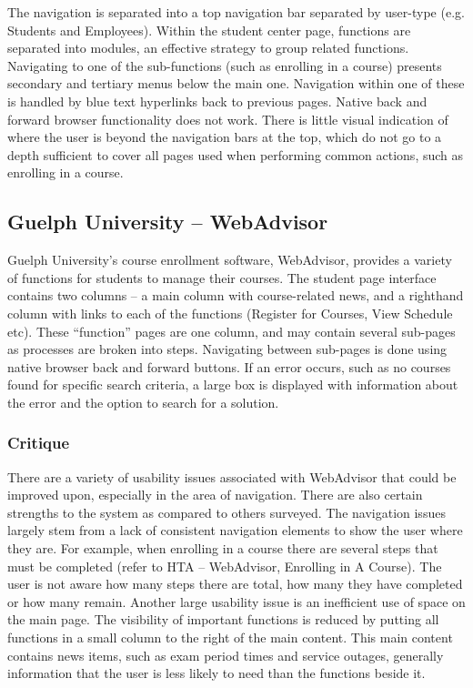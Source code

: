\documentclass[10pt]{article}
\newenvironment{InlineColumnFigure}
{\par\medskip\noindent\minipage{\linewidth}}
{\endminipage\par\medskip}
\newcommand{\Caption}[1]
{\vspace{-4mm}\fontsize{9}{9}\textbf{Figure \refstepcounter{figCounter} 
\arabic{figCounter}: #1}}
\newcounter{figCounter}
\begin{document}
\begin{multicols}{2}
The navigation is separated into a top navigation bar separated by user-type 
(e.g. Students and Employees). Within the student center page, functions are 
separated into modules, an effective strategy to group related functions. 
Navigating to one of the sub-functions (such as enrolling in a course) presents 
secondary and tertiary menus below the main one. Navigation within one of these 
is handled by blue text hyperlinks back to previous pages. Native back and 
forward browser functionality does not work. There is little visual indication 
of where the user is beyond the navigation bars at the top, which do not go to a 
depth sufficient to cover all pages used when performing common actions, such as 
enrolling in a course.

\subsection*{Guelph University -- WebAdvisor}
Guelph University's course enrollment software, WebAdvisor, provides a variety 
of functions for students to manage their courses. The student page interface 
contains two columns -- a main column with course-related news, and a righthand 
column with links to each of the functions (Register for Courses, View Schedule 
etc). These ``function'' pages are one column, and may contain several sub-pages 
as processes are broken into steps. Navigating between sub-pages is done using 
native browser back and forward buttons. If an error occurs, such as no courses 
found for specific search criteria, a large box is displayed with information 
about the error and the option to search for a solution.


\subsubsection*{Critique}
There are a variety of usability issues associated with \mbox{WebAdvisor} that 
could be improved upon, especially in the area of navigation. There are also 
certain strengths to the system as compared to others surveyed. The navigation 
issues largely stem from a lack of consistent navigation elements to show the 
user where they are. For example, when enrolling in a course there are several 
steps that must be completed (refer to HTA -- WebAdvisor, Enrolling in A 
Course). The user is not aware how many steps there are total, how many they 
have completed or how many remain. Another large usability issue is an 
inefficient use of space on the main page. The visibility of important functions 
is reduced by putting all functions in a small column to the right of the main 
content. This main content contains news items, such as exam period times and 
service outages, generally information that the user is less likely to need than 
the functions beside it.


\end{multicols}
\end{document}
